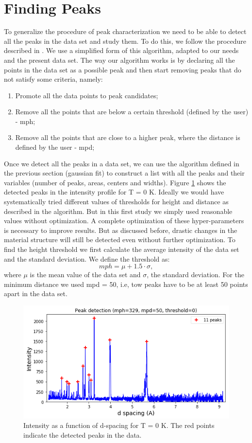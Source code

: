 

\section{Finding Peaks} \label{FindPeaks}
	To generalize the procedure of peak characterization we need to be able to detect all the peaks in the data set and study them. To do this, we follow the procedure described in  \cite{DetectPeaks}. We use a simplified form of this algorithm, adapted to our needs and the present data set.
	The way our algorithm works is by declaring all the points in the data set as a possible peak and then start removing peaks that do not satisfy some criteria, namely:
	\begin{enumerate}
  	\item Promote all the data points to peak candidates;
	 \item Remove all the points that are below a certain threshold (defined by the user) - mph;
	 \item Remove all the points that are close to a higher peak, where the distance is defined by the user - mpd;	 
	\end{enumerate}

	Once we detect all the peaks in a data set, we can use the algorithm defined in the previous section (gaussian fit) to construct a list with all the peaks and their variables (number of peaks, areas, centers and widths).
	Figure \ref{fig:findpeaks} shows the detected peaks in the intensity profile for T = 0 K. Ideally we would have systematically tried different values of thresholds for height and distance as described in the algorithm. But in this first study we simply used reasonable values without optimization. A complete optimization of these hyper-parameters is necessary to improve results. But as discussed before, drastic changes in the material structure will still be detected even without further optimization.
	To find the height threshold we first calculate the average intensity of the data set and the standard deviation. We define the threshold as:
	\begin{equation} \label{eq:mph}
	mph = \mu + 1.5\cdot \sigma,
	\end{equation}
	where $\mu$ is the mean value of the data set and $\sigma$, the standard deviation. For the minimum distance we used mpd = 50, i.e, tow peaks have to be at least 50 points apart in the data set.
	
\begin{figure}[h]
  \centering
  \includegraphics[scale=0.3]{../figs/peaks0.png}
  \caption{Intensity as a function of d-spacing for T = 0 K. The red points indicate the detected peaks in the data.}
  \label{fig:findpeaks}
\end{figure}